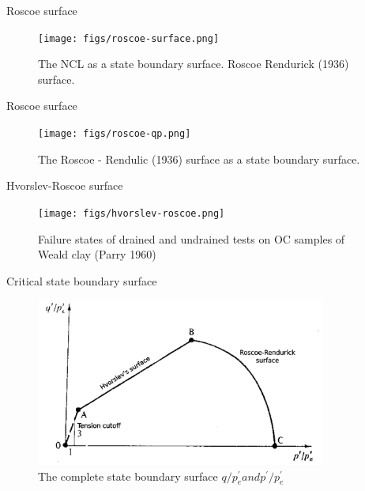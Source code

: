 \documentclass[notes]{beamer}
\begin{document}
\begin{frame}{Roscoe surface}
	\begin{figure}
		\texttt{[image: figs/roscoe-surface.png]}
		\caption*{The NCL as a state boundary surface. Roscoe Rendurick (1936) surface.}
	\end{figure}
\end{frame}

\begin{frame}{Roscoe surface}
	\begin{figure}
		\texttt{[image: figs/roscoe-qp.png]}
		\caption*{The Roscoe - Rendulic (1936) surface as a state boundary surface.}
	\end{figure}
\end{frame}


\begin{frame}{Hvorslev-Roscoe surface}
	\begin{figure}
		\texttt{[image: figs/hvorslev-roscoe.png]}
		\caption*{Failure states of drained and undrained tests on OC samples of Weald clay (Parry 1960)}
	\end{figure}
\end{frame}


\begin{frame}{Critical state boundary surface}
	\begin{figure}
		\includegraphics[width=0.85\textwidth]{figs/bounding-surface.png}
		\caption*{The complete state boundary surface $q/p_e^\prime and p^\prime/p_e^\prime$}
	\end{figure}
\end{frame}
\end{document}
